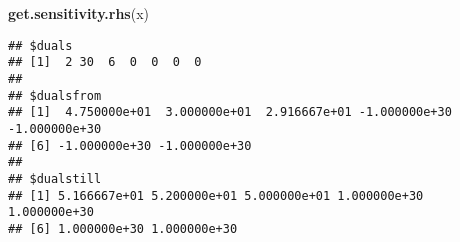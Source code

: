 \documentclass[
]{article}
\newenvironment{Shaded}{\begin{snugshade}}{\end{snugshade}}
\newcommand{\FunctionTok}[1]{\textcolor[rgb]{0.13,0.29,0.53}{\textbf{#1}}}
\newcommand{\NormalTok}[1]{#1}
\begin{document}
\begin{Shaded}
\begin{Highlighting}[]
\FunctionTok{get.sensitivity.rhs}\NormalTok{(x)}
\end{Highlighting}
\end{Shaded}

\begin{verbatim}
## $duals
## [1]  2 30  6  0  0  0  0
## 
## $dualsfrom
## [1]  4.750000e+01  3.000000e+01  2.916667e+01 -1.000000e+30 -1.000000e+30
## [6] -1.000000e+30 -1.000000e+30
## 
## $dualstill
## [1] 5.166667e+01 5.200000e+01 5.000000e+01 1.000000e+30 1.000000e+30
## [6] 1.000000e+30 1.000000e+30
\end{verbatim}
\end{document}
